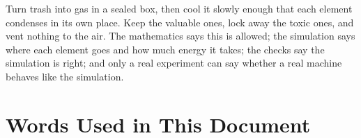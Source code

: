 \documentclass[11pt,a4paper]{article}
\begin{document}
\begin{plain}
Turn trash into gas in a sealed box, then cool it slowly enough that each element condenses in its own place. Keep the valuable ones, lock away the toxic ones, and vent nothing to the air. The mathematics says this is allowed; the simulation says where each element goes and how much energy it takes; the checks say the simulation is right; and only a real experiment can say whether a real machine behaves like the simulation.
\end{plain}

\section{Words Used in This Document}\label{ch:glossary}
\end{document}

